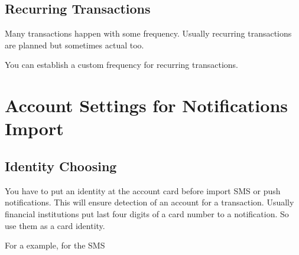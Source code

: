\documentclass[a4paper,10pt,english]{sphinxmanual}
\begin{document}
\section{Recurring Transactions}
\label{\detokenize{transactions:recurring-transactions}}
Many transactions happen with some frequency. Usually recurring transactions
are planned but sometimes actual too.

You can establish a custom frequency for recurring transactions.

\noindent{}

\noindent{}

\noindent{}

\noindent{}


\chapter{Account Settings for Notifications Import}
\label{\detokenize{account-identities:account-settings-for-notifications-import}}\label{\detokenize{account-identities:chapter-account-identities}}\label{\detokenize{account-identities::doc}}

\section{Identity Choosing}
\label{\detokenize{account-identities:identity-choosing}}
You have to put an identity at the account card before import SMS or push notifications.
This will ensure detection of an account for a transaction. Usually financial institutions
put last four digits of a card number to a notification. So use them as a card identity.

For a example, for the SMS

\begin{sphinxVerbatim}[commandchars=\\\{\}]
        
\end{sphinxVerbatim}
\end{document}
